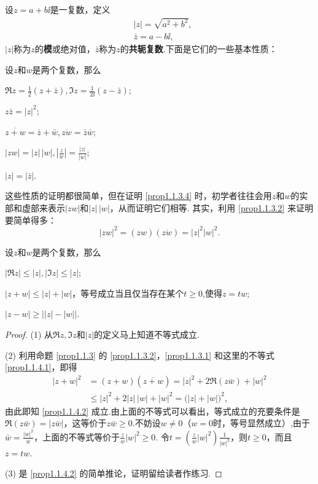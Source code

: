 设$z=a+b\ii$是一复数，定义
\begin{align*}
&|z|=\sqrt{a^2+b^2},\\
&\bar z=a-b\ii,
\end{align*}
$|z|$称为$z$的\textbf{模}或绝对值，$\bar z$称为$z$的\textbf{共轭复数}.下面是它们的一些基本性质：
\begin{prop}\label{prop1.1.3}
设$z$和$w$是两个复数，那么
\begin{eenum}
  \item $\Re z=\frac12(z+\bar z),\Im z=\frac1{2\ii}(z-\bar z)$;\label{prop1.1.3.1}
  \item $z\bar z=|z|^2$;\label{prop1.1.3.2}
  \item $\overline{z+w}=\bar z+\bar w,\overline{zw}=\bar z\bar w$;\label{prop1.1.3.3}
  \item $|zw|=|z|\,|w|,\left|\frac zw\right|=\frac{|z|}{|w|}$;\label{prop1.1.3.4}
  \item $|z|=|\bar z|$.\label{prop1.1.3.5}
\end{eenum}
\end{prop}
这些性质的证明都很简单，但在证明 \ref{prop1.1.3.4} 时，初学者往往会用$z$和$w$的实部和虚部来表示$|zw|$和$|z|\,|w|$，从而证明它们相等. 其实，利用 \ref{prop1.1.3.2} 来证明要简单得多：
\[|zw|^2=(zw)(\overline{zw})=|z|^2|w|^2.\]

\begin{prop}\label{prop1.1.4}
设$z$和$w$是两个复数，那么
\begin{eenum}
  \item $|\Re z|\le |z|,|\Im z|\le |z|$;\label{prop1.1.4.1}
  \item $|z+w|\le|z|+|w|$，等号成立当且仅当存在某个$t\ge0$,使得$z=tw$;\label{prop1.1.4.2}
  \item $|z-w|\ge\bigl||z|-|w|\bigr|$.\label{prop1.1.4.3}
\end{eenum}
\end{prop}
\begin{proof}
(1) 从$\Re z,\Im z$和$|z|$的定义马上知道不等式成立.

(2) 利用命题 \ref{prop1.1.3} 的 \ref{prop1.1.3.2}，\ref{prop1.1.3.1} 和这里的不等式 \ref{prop1.1.4.1}，即得
\begin{align*}
|z+w|^2&=(z+w)(\overline{z+w})=|z|^2+2\Re(z\bar w)+|w|^2\\
&\le|z|^2+2|z|\,|w|+|w|^2=\big(|z|+|w|\big)^2,
\end{align*}
由此即知 \ref{prop1.1.4.2} 成立.由上面的不等式可以看出，等式成立的充要条件是$\Re(z\bar w)=|z\bar w|$，这等价于$z\bar w\ge0$.不妨设$w\ne0$（$w=0$时，等号显然成立）,由于$\bar w=\frac{|w|^2}{w}$，上面的不等式等价于$\frac zw|w|^2\ge0$. 令$t=\left(\frac zw|w|^2\right)\frac1{|w|^2}$，则$t\ge0$，而且$z=tw$.

(3) 是 \ref{prop1.1.4.2} 的简单推论，证明留给读者作练习.
\end{proof}

